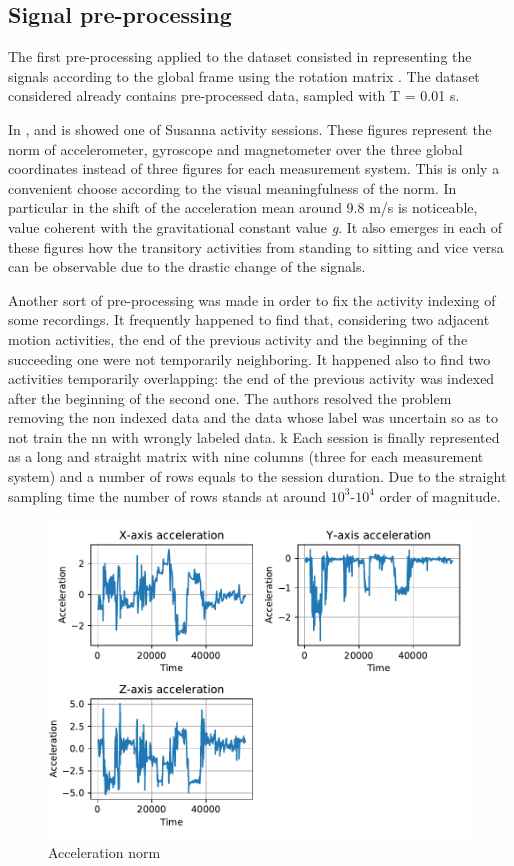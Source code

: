 \subsection{Signal pre-processing}
The first pre-processing applied to the dataset consisted in representing the signals according to the global frame using the rotation matrix . The dataset considered already contains pre-processed data, sampled with T = 0.01 s.

In ,  and  is showed one of Susanna activity sessions. These figures represent the norm of accelerometer, gyroscope and magnetometer over the three global coordinates instead of three figures for each measurement system. This is only a convenient choose according to the visual meaningfulness of the norm. In particular in  the shift of the acceleration mean around 9.8 m/s is noticeable, value coherent with the gravitational constant value \textit{g}. It also emerges in each of these figures how the transitory activities from standing to sitting and vice versa can be observable due to the drastic change of the signals.

Another sort of pre-processing was made in order to fix the activity indexing of some recordings. It frequently happened to find that, considering two adjacent motion activities, the end of the previous activity and the beginning of the succeeding one were not temporarily neighboring. It happened also to find two activities temporarily overlapping: the end of the previous activity was indexed after the beginning of the second one. 
The authors resolved the problem removing the non indexed data and the data whose label was uncertain so as to not train the \gls{nn} with wrongly labeled data.
k
Each session is finally represented as a long and straight matrix with nine columns (three for each measurement system) and a number of rows equals to the session duration. Due to the straight sampling time the number of rows stands at around $10^3$-$10^4$ order of magnitude.


\begin{figure}[htp]
\includegraphics[scale=0.55]{acceleration_susanna.pdf}
\caption{Acceleration norm}
\label{fig:acc}
\end{figure}

